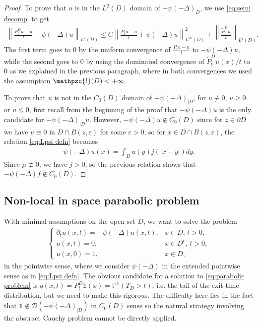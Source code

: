\documentclass[reqno]{amsart}
\theoremstyle{remark}
\numberwithin{equation}{section} %
\newcommand{\Lpsi}{\psi(-\Delta)}
\newcommand{\LpsiD}{\Lpsi_{|D}}
\newcommand{\DD}{\mathcal{D}}
\newcommand{\wt}{\widetilde}
\newcommand{\1}{\mathds{1}}
\begin{document}
\begin{proof}
		To prove that $u$ is in the $L^2(D)$ domain of $-\Lpsi_D$, we use \eqref{eq:semi decomp} to get
		\begin{align*}
			\left\|\frac{ P^D_tu-u}{t}+\Lpsi u\right\|_{L^2(D)}\le 	C\left\|\frac{P_tu-u}{t}+\Lpsi u\right\|^2_{L^\infty(D)}+\left\|\frac{\wt  P^D_t u}{t}\right\|_{L^2(D)}.
		\end{align*}
		The first term goes to 0 by the uniform convergence of $\frac{P_tu-u}{t}$ to $-\Lpsi u$, while the second goes to 0 by using the dominated convergence of $\wt  P^D_tu(x)/t$ to 0 as we explained in the previous paragraph, where in both convergences we used the assumption $\mathpzc{l}(D)<+\infty$.
		
		To prove that  $u$ is not in the $C_0(D)$ domain of $-\LpsiD$, for $u\not\equiv0$, $u\ge0$ or $u\le0$, first recall from the beginning of the proof that $-\Lpsi u$ is the only candidate for $-\LpsiD u$. However, $-\Lpsi u\not\in C_0(D)$ since for $z\in \partial D$ we have $u\equiv0$ in $D\cap B(z,\varepsilon)$ for some $\varepsilon>0$, so for $x\in D\cap B(z,\varepsilon)$, the relation  \eqref{eq:Lpsi defn} becomes
		\begin{align*}
			\Lpsi u(x)=\int_{D}u(y)j(|x-y|)dy.
		\end{align*}
		Since $\mu\not\equiv0$, we have $j>0$, so the previous relation shows that $-\Lpsi f\not\in C_0(D)$.	
	\end{proof}
	
	\subsection{Non-local in space parabolic problem}\label{ss:parabolic-local}
	With minimal assumptions on the open set $D$, we want to solve the problem
	\begin{align}
		\begin{cases}
			\partial_t u(x,t)=-\Lpsi u(x,t), & x\in D,\,t>0,\\
			u(x,t)=0,& x\in D^c,\, t>0,\\
			u(x,0)=1,& x\in D,
		\end{cases}\label{eq:parabolic problem}
	\end{align}
	in the pointwise sense, where we consider $\Lpsi$ in the extended pointwise sense as in \eqref{eq:Lpsi defn}. The obvious candidate for a solution to \eqref{eq:parabolic problem} is $q(x,t)= P^D_t\mathds{1}(x)=\mathds{P}^x(T_D>t)$, i.e. the tail of the exit time distribution, but we need to make this rigorous. The difficulty here lies in the fact that $\mathds{1}\not\in \DD(-\LpsiD)$ in $C_0(D)$ sense so the natural strategy involving the abstract Cauchy problem cannot be directly applied. 
	
\end{document}
